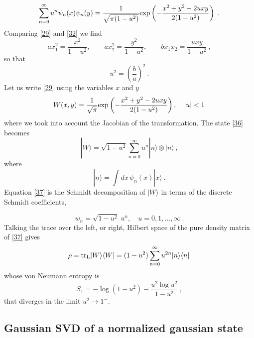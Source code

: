 \documentclass[a4paper,preprintnumbers,nofootinbib,twocolumn]{quantumarticle}
\def\beq{\begin{equation}}
\def\eeq{\end{equation}}
\begin{document}
\beq
\sum_{n=0}^\infty u^n  \psi_n(x) \psi_n(y)  = \frac{ 1}{   \sqrt{\pi(1- u^2)}}  {\rm exp} \left( - \frac{ x^2 + y^2 - 2 u x y}{ 2 (1 - u^2)}  \right) \ . 
\label{32}
\eeq
Comparing \eqref{29} and \eqref{32} we find
\beq
a x_1^2 = \frac{ x^2}{ 1- u^2}, \qquad a x_2^2  = \frac{y^2}{ 1 - u^2}, \qquad b x_1 x_2 = \frac{ u xy}{ 1 - u^2} \ , 
\label{33}
\eeq
so that 
\beq
u^2 =  \left( \frac{b}{a} \right)^2  \ . 
\label{34}
\eeq
Let us write  \eqref{29} using the variables $x$ and $y$ 
\beq
W(x, y) = \frac{ 1}{   \sqrt{\pi}}  {\rm exp} \left( - \frac{ x^2 + y^2 - 2 u x y}{ 2 (1 - u^2)}  \right) , \quad |u | < 1 \, 
\label{35}
\eeq
where we took into account the Jacobian of the transformation. The state \eqref{36} becomes
\beq
| W \rangle = \sqrt{1 - u^2} \sum_{n=0}^\infty   u^n   |n \rangle \otimes | n \rangle \, , 
\label{37}
\eeq
where 
\beq
|n \rangle = \int dx \, \psi_n(x) |x \rangle \ . 
\label{38}
\eeq
Equation  \eqref{37} is  the Schmidt decomposition
of $|W\rangle$  in terms of  the discrete Schmidt coefficients, 

\beq
w_n = \sqrt{1 - u^2}  \; u^n,  \quad u = 0, 1, \dots, \infty \ . 
\label{39} 
\eeq
Talking the trace over the left, or right, Hilbert space of the pure density matrix of \eqref{37} gives
\beq
\rho = {\rm tr}_{\rm L} | W \rangle \langle W| = (1 - u^2) \sum_{n=0}^\infty u^{2 n} | n \rangle \langle n| \, 
\label{39b}
\eeq
whose  von Neumann entropy is 
\beq
S_1 = - \log (1 - u^2) - \frac{ u^2 \log u^2}{ 1 - u^2} \ , 
\label{41}
\eeq
that diverges in the limit $u^2 \rightarrow 1^-$. 






\subsection{Gaussian SVD of a normalized gaussian state}
\end{document}

